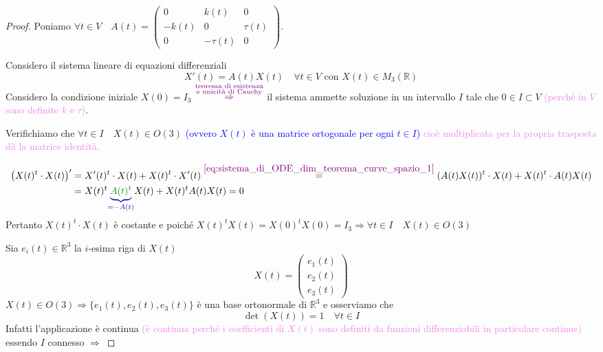         \begin{proof}
        \mbox{}

        Poniamo $\forall t \in V \quad A(t) = \begin{pmatrix} 0 & k(t) & 0 \\ -k(t) & 0 & \tau(t) \\ 0 & -\tau(t) & 0 \end{pmatrix}$.

        Considero il sistema lineare di equazioni differenziali 
        \begin{equation}
        \label{eq:sistema_di_ODE_dim_teorema_curve_spazio_1}
        X'(t) = A(t) X(t) \quad \forall t \in V \text{ con } X(t) \in M_3(\mathbb{R})
        \end{equation}
        Considero la condizione iniziale \textcolor{celeste}{$X(0) = I_3$} $\textcolor{violet}{\overset{\substack{\text{teorema di esistenza} \\ \text{e unicità di Cauchy} }}{\Rightarrow}}$ il sistema ammette soluzione
        in un intervallo $I$ tale che $0 \in I \subset V$ \textcolor{violet}{(perché in $V$ sono definite $k$ e $\tau$)}.

        Verifichiamo che $\forall t \in I \quad X(t) \in O(3)$ \textcolor{blue}{(ovvero $X(t)$ è una matrice ortogonale per ogni $t \in I$)}
        \textcolor{violet}{cioè moltiplicata per la propria trasposta dà la matrice identità.}

        \begin{align*}
        \left(X(t)^t \cdot X(t) \right)' &= X'(t)^t \cdot X(t) + X(t)^t \cdot X'(t) \overset{\textcolor{violet}{\eqref{eq:sistema_di_ODE_dim_teorema_curve_spazio_1}}}{=} (A(t) X(t))^t \cdot X(t) + X(t)^t \cdot A(t) X(t) \\
        &= X(t)^t \textcolor{blu}{\underbrace{\textcolor{verde}{A(t)^t}}_{=-A(t)}} X(t) + X(t)^t A(t) X(t)=0
        \end{align*}
        Pertanto $X(t)^t \cdot X(t)$ è costante e poiché 
        $X(t)^t X(t) = X(0)^t X(0) = I_3 \Rightarrow \forall t \in I \quad X(t) \in O(3)$

        Sia $e_i(t) \in \mathbb{R}^3$ la $i$-esima riga di $X(t)$
        \[ X(t) = \begin{pmatrix} e_1(t) \\ e_2(t) \\ e_3(t) \end{pmatrix} \]
        $X(t) \in O(3) \Rightarrow \{ e_1(t), e_2(t), e_3(t) \}$ è una base ortonormale di $\mathbb{R}^3$ e osserviamo che
        \[ \det(X(t)) = 1 \quad \forall t \in I \]
        Infatti l'applicazione è continua \textcolor{violet}{(è continua perché i coefficienti di $X(t)$ sono definiti da funzioni differenziabili in particolare continue)}
        essendo $I$ connesso $\Rightarrow$
        

\end{proof}
